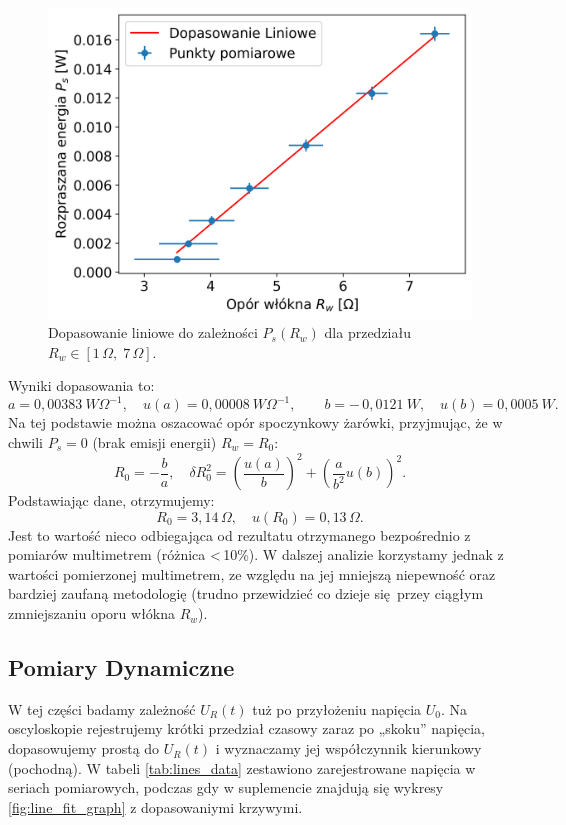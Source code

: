\documentclass[12pt]{article}
\begin{document}
\begin{figure}[H]
    \centering
    \includegraphics[scale=0.58]{pomiary_moc_linia}
    \caption{Dopasowanie liniowe do zależności $P_s(R_w)$ dla przedziału $R_w \in [1\,\Omega,\; 7\,\Omega]$.}
    \label{fig:power_res_line}
\end{figure}
Wyniki dopasowania to:
\[
    a = 0{,}00383 \ W\Omega^{-1}, \quad u(a) = 0{,}00008 \ W\Omega^{-1}, \qquad
    b = -\,0{,}0121 \ W, \quad u(b) = 0{,}0005 \ W.
\]
Na tej podstawie można oszacować opór spoczynkowy żarówki, przyjmując, że w chwili $P_s = 0$ (brak emisji energii) $R_w = R_0$:
\begin{equation}
    R_0 = -\frac{b}{a}, 
    \quad
    \delta R_0^2 = \left(\frac{u(a)}{b}\right)^2 + \left(\frac{a}{b^2}u(b)\right)^2.
\end{equation}
Podstawiając dane, otrzymujemy:
\[
    R_0 = 3{,}14\,\Omega, \quad u(R_0) = 0{,}13\,\Omega.
\]
Jest to wartość nieco odbiegająca od rezultatu otrzymanego bezpośrednio z pomiarów multimetrem (różnica <\,10\%). 
W dalszej analizie korzystamy jednak z wartości pomierzonej multimetrem, ze względu na jej mniejszą niepewność oraz bardziej zaufaną metodologię (trudno przewidzieć co dzieje się przey ciągłym zmniejszaniu oporu włókna $R_w$).

\subsection{Pomiary Dynamiczne}
W tej części badamy zależność $U_R(t)$ tuż po przyłożeniu napięcia $U_0$. Na oscyloskopie rejestrujemy krótki przedział czasowy zaraz po „skoku” napięcia, dopasowujemy prostą do $U_R(t)$ i wyznaczamy jej współczynnik kierunkowy (pochodną). W tabeli \ref{tab:lines_data} zestawiono zarejestrowane napięcia w seriach pomiarowych, podczas gdy w suplemencie znajdują się wykresy \ref{fig:line_fit_graph} z dopasowaniymi krzywymi.
\end{document}
